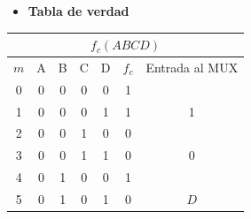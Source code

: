 \begin{itemize}[nosep]\item\textbf{Tabla de verdad}\end{itemize}
\begin{center}
\begin{tabular}{ccccccc}
\multicolumn{7}{c}{\cellcolor[HTML]{FFFFC7}$f_c(ABCD)$}                                                                                                                                                                                                                       \\ \hline
\multicolumn{1}{c|}{\cellcolor[HTML]{9AFF99}$m$} & \cellcolor[HTML]{ECF4FF}A & \cellcolor[HTML]{ECF4FF}B & \cellcolor[HTML]{ECF4FF}C & \multicolumn{1}{c|}{\cellcolor[HTML]{ECF4FF}D} & \multicolumn{1}{c|}{\cellcolor[HTML]{FFCCC9}$f_c$} & Entrada al MUX                   \\ \hline
\multicolumn{1}{c|}{0}                           & 0                         & 0                         & 0                         & \multicolumn{1}{c|}{0}                         & \multicolumn{1}{c|}{1}                             &                                  \\
\multicolumn{1}{c|}{1}                           & 0                         & 0                         & 0                         & \multicolumn{1}{c|}{1}                         & \multicolumn{1}{c|}{1}                             & \multirow{-2}{*}{1}              \\ \hline
\multicolumn{1}{c|}{2}                           & 0                         & 0                         & 1                         & \multicolumn{1}{c|}{0}                         & \multicolumn{1}{c|}{0}                             &                                  \\
\multicolumn{1}{c|}{3}                           & 0                         & 0                         & 1                         & \multicolumn{1}{c|}{1}                         & \multicolumn{1}{c|}{0}                             & \multirow{-2}{*}{0}              \\ \hline
\multicolumn{1}{c|}{4}                           & 0                         & 1                         & 0                         & \multicolumn{1}{c|}{0}                         & \multicolumn{1}{c|}{1}                             &                                  \\
\multicolumn{1}{c|}{5}                           & 0                         & 1                         & 0                         & \multicolumn{1}{c|}{1}                         & \multicolumn{1}{c|}{0}                             & \multirow{-2}{*}{$D$}            \\ \hline

\end{tabular}
\end{center}
